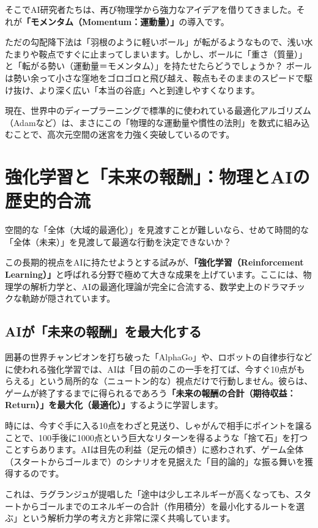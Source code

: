 そこでAI研究者たちは、再び物理学から強力なアイデアを借りてきました。それが\textbf{「モメンタム（Momentum：運動量）」}の導入です。

ただの勾配降下法は「羽根のように軽いボール」が転がるようなもので、浅い水たまりや鞍点ですぐに止まってしまいます。しかし、ボールに「重さ（質量）」と「転がる勢い（運動量＝モメンタム）」を持たせたらどうでしょうか？ ボールは勢い余って小さな窪地をゴロゴロと飛び越え、鞍点もそのままのスピードで駆け抜け、より深く広い「本当の谷底」へと到達しやすくなります。

現在、世界中のディープラーニングで標準的に使われている最適化アルゴリズム（Adamなど）は、まさにこの「物理的な運動量や慣性の法則」を数式に組み込むことで、高次元空間の迷宮を力強く突破しているのです。

\section{強化学習と「未来の報酬」：物理とAIの歴史的合流}

空間的な「全体（大域的最適化）」を見渡すことが難しいなら、せめて時間的な「全体（未来）」を見渡して最適な行動を決定できないか？

この長期的視点をAIに持たせようとする試みが、\textbf{「強化学習（Reinforcement Learning）」}と呼ばれる分野で極めて大きな成果を上げています。ここには、物理学の解析力学と、AIの最適化理論が完全に合流する、数学史上のドラマチックな軌跡が隠されています。

\subsection{AIが「未来の報酬」を最大化する}

囲碁の世界チャンピオンを打ち破った「AlphaGo」や、ロボットの自律歩行などに使われる強化学習では、AIは「目の前のこの一手を打てば、今すぐ10点がもらえる」という局所的な（ニュートン的な）視点だけで行動しません。彼らは、ゲームが終了するまでに得られるであろう\textbf{「未来の報酬の合計（期待収益：Return）」を最大化（最適化）」}するように学習します。

時には、今すぐ手に入る10点をわざと見送り、しゃがんで相手にポイントを譲ることで、100手後に1000点という巨大なリターンを得るような「捨て石」を打つことすらあります。AIは目先の利益（足元の傾き）に惑わされず、ゲーム全体（スタートからゴールまで）のシナリオを見据えた「目的論的」な振る舞いを獲得するのです。

これは、ラグランジュが提唱した「途中は少しエネルギーが高くなっても、スタートからゴールまでのエネルギーの合計（作用積分）を最小化するルートを選ぶ」という解析力学の考え方と非常に深く共鳴しています。

